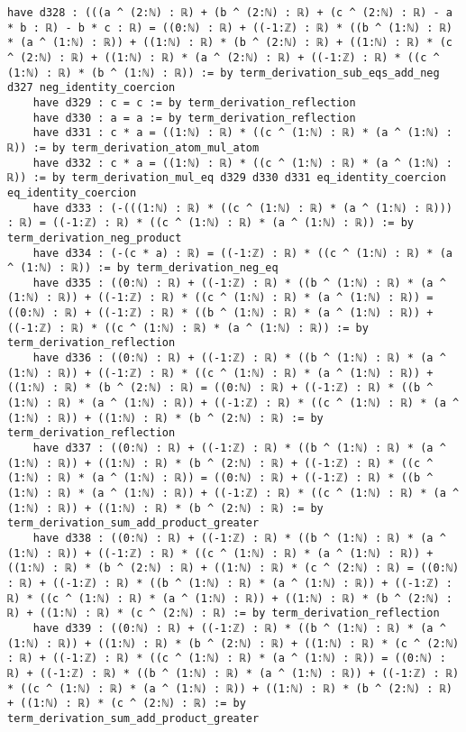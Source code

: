 \documentclass{article}
\begin{document}
\begin{tcolorbox}[colback=white!10, width=\linewidth]
\begin{lstlisting}[language=Lean4]
    have d328 : (((a ^ (2:ℕ) : ℝ) + (b ^ (2:ℕ) : ℝ) + (c ^ (2:ℕ) : ℝ) - a * b : ℝ) - b * c : ℝ) = ((0:ℕ) : ℝ) + ((-1:ℤ) : ℝ) * ((b ^ (1:ℕ) : ℝ) * (a ^ (1:ℕ) : ℝ)) + ((1:ℕ) : ℝ) * (b ^ (2:ℕ) : ℝ) + ((1:ℕ) : ℝ) * (c ^ (2:ℕ) : ℝ) + ((1:ℕ) : ℝ) * (a ^ (2:ℕ) : ℝ) + ((-1:ℤ) : ℝ) * ((c ^ (1:ℕ) : ℝ) * (b ^ (1:ℕ) : ℝ)) := by term_derivation_sub_eqs_add_neg d327 neg_identity_coercion
    have d329 : c = c := by term_derivation_reflection
    have d330 : a = a := by term_derivation_reflection
    have d331 : c * a = ((1:ℕ) : ℝ) * ((c ^ (1:ℕ) : ℝ) * (a ^ (1:ℕ) : ℝ)) := by term_derivation_atom_mul_atom
    have d332 : c * a = ((1:ℕ) : ℝ) * ((c ^ (1:ℕ) : ℝ) * (a ^ (1:ℕ) : ℝ)) := by term_derivation_mul_eq d329 d330 d331 eq_identity_coercion eq_identity_coercion
    have d333 : (-(((1:ℕ) : ℝ) * ((c ^ (1:ℕ) : ℝ) * (a ^ (1:ℕ) : ℝ))) : ℝ) = ((-1:ℤ) : ℝ) * ((c ^ (1:ℕ) : ℝ) * (a ^ (1:ℕ) : ℝ)) := by term_derivation_neg_product
    have d334 : (-(c * a) : ℝ) = ((-1:ℤ) : ℝ) * ((c ^ (1:ℕ) : ℝ) * (a ^ (1:ℕ) : ℝ)) := by term_derivation_neg_eq
    have d335 : ((0:ℕ) : ℝ) + ((-1:ℤ) : ℝ) * ((b ^ (1:ℕ) : ℝ) * (a ^ (1:ℕ) : ℝ)) + ((-1:ℤ) : ℝ) * ((c ^ (1:ℕ) : ℝ) * (a ^ (1:ℕ) : ℝ)) = ((0:ℕ) : ℝ) + ((-1:ℤ) : ℝ) * ((b ^ (1:ℕ) : ℝ) * (a ^ (1:ℕ) : ℝ)) + ((-1:ℤ) : ℝ) * ((c ^ (1:ℕ) : ℝ) * (a ^ (1:ℕ) : ℝ)) := by term_derivation_reflection
    have d336 : ((0:ℕ) : ℝ) + ((-1:ℤ) : ℝ) * ((b ^ (1:ℕ) : ℝ) * (a ^ (1:ℕ) : ℝ)) + ((-1:ℤ) : ℝ) * ((c ^ (1:ℕ) : ℝ) * (a ^ (1:ℕ) : ℝ)) + ((1:ℕ) : ℝ) * (b ^ (2:ℕ) : ℝ) = ((0:ℕ) : ℝ) + ((-1:ℤ) : ℝ) * ((b ^ (1:ℕ) : ℝ) * (a ^ (1:ℕ) : ℝ)) + ((-1:ℤ) : ℝ) * ((c ^ (1:ℕ) : ℝ) * (a ^ (1:ℕ) : ℝ)) + ((1:ℕ) : ℝ) * (b ^ (2:ℕ) : ℝ) := by term_derivation_reflection
    have d337 : ((0:ℕ) : ℝ) + ((-1:ℤ) : ℝ) * ((b ^ (1:ℕ) : ℝ) * (a ^ (1:ℕ) : ℝ)) + ((1:ℕ) : ℝ) * (b ^ (2:ℕ) : ℝ) + ((-1:ℤ) : ℝ) * ((c ^ (1:ℕ) : ℝ) * (a ^ (1:ℕ) : ℝ)) = ((0:ℕ) : ℝ) + ((-1:ℤ) : ℝ) * ((b ^ (1:ℕ) : ℝ) * (a ^ (1:ℕ) : ℝ)) + ((-1:ℤ) : ℝ) * ((c ^ (1:ℕ) : ℝ) * (a ^ (1:ℕ) : ℝ)) + ((1:ℕ) : ℝ) * (b ^ (2:ℕ) : ℝ) := by term_derivation_sum_add_product_greater
    have d338 : ((0:ℕ) : ℝ) + ((-1:ℤ) : ℝ) * ((b ^ (1:ℕ) : ℝ) * (a ^ (1:ℕ) : ℝ)) + ((-1:ℤ) : ℝ) * ((c ^ (1:ℕ) : ℝ) * (a ^ (1:ℕ) : ℝ)) + ((1:ℕ) : ℝ) * (b ^ (2:ℕ) : ℝ) + ((1:ℕ) : ℝ) * (c ^ (2:ℕ) : ℝ) = ((0:ℕ) : ℝ) + ((-1:ℤ) : ℝ) * ((b ^ (1:ℕ) : ℝ) * (a ^ (1:ℕ) : ℝ)) + ((-1:ℤ) : ℝ) * ((c ^ (1:ℕ) : ℝ) * (a ^ (1:ℕ) : ℝ)) + ((1:ℕ) : ℝ) * (b ^ (2:ℕ) : ℝ) + ((1:ℕ) : ℝ) * (c ^ (2:ℕ) : ℝ) := by term_derivation_reflection
    have d339 : ((0:ℕ) : ℝ) + ((-1:ℤ) : ℝ) * ((b ^ (1:ℕ) : ℝ) * (a ^ (1:ℕ) : ℝ)) + ((1:ℕ) : ℝ) * (b ^ (2:ℕ) : ℝ) + ((1:ℕ) : ℝ) * (c ^ (2:ℕ) : ℝ) + ((-1:ℤ) : ℝ) * ((c ^ (1:ℕ) : ℝ) * (a ^ (1:ℕ) : ℝ)) = ((0:ℕ) : ℝ) + ((-1:ℤ) : ℝ) * ((b ^ (1:ℕ) : ℝ) * (a ^ (1:ℕ) : ℝ)) + ((-1:ℤ) : ℝ) * ((c ^ (1:ℕ) : ℝ) * (a ^ (1:ℕ) : ℝ)) + ((1:ℕ) : ℝ) * (b ^ (2:ℕ) : ℝ) + ((1:ℕ) : ℝ) * (c ^ (2:ℕ) : ℝ) := by term_derivation_sum_add_product_greater

\end{lstlisting}
\end{tcolorbox}
\end{document}
